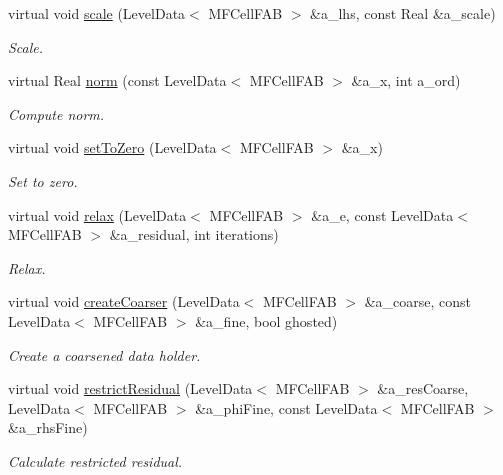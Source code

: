 \begin{DoxyCompactItemize}
virtual void \hyperlink{classmfconductivityop_a88308b72e9cb27f606380115227d2387}{scale} (Level\+Data$<$ M\+F\+Cell\+F\+AB $>$ \&a\+\_\+lhs, const Real \&a\+\_\+scale)
\begin{DoxyCompactList}\small\item\em Scale. \end{DoxyCompactList}\item 
virtual Real \hyperlink{classmfconductivityop_a7a14a2446b9a716cd3a96c6ba8327899}{norm} (const Level\+Data$<$ M\+F\+Cell\+F\+AB $>$ \&a\+\_\+x, int a\+\_\+ord)
\begin{DoxyCompactList}\small\item\em Compute norm. \end{DoxyCompactList}\item 
virtual void \hyperlink{classmfconductivityop_a7900dc43b0bb3841041b1b65ad8a76f9}{set\+To\+Zero} (Level\+Data$<$ M\+F\+Cell\+F\+AB $>$ \&a\+\_\+x)
\begin{DoxyCompactList}\small\item\em Set to zero. \end{DoxyCompactList}\item 
virtual void \hyperlink{classmfconductivityop_aa626950a41c6417ad9a95d3fcc053c75}{relax} (Level\+Data$<$ M\+F\+Cell\+F\+AB $>$ \&a\+\_\+e, const Level\+Data$<$ M\+F\+Cell\+F\+AB $>$ \&a\+\_\+residual, int iterations)
\begin{DoxyCompactList}\small\item\em Relax. \end{DoxyCompactList}\item 
virtual void \hyperlink{classmfconductivityop_a744d58e6ef1b02997d115f8910c1ceac}{create\+Coarser} (Level\+Data$<$ M\+F\+Cell\+F\+AB $>$ \&a\+\_\+coarse, const Level\+Data$<$ M\+F\+Cell\+F\+AB $>$ \&a\+\_\+fine, bool ghosted)
\begin{DoxyCompactList}\small\item\em Create a coarsened data holder. \end{DoxyCompactList}\item 
virtual void \hyperlink{classmfconductivityop_ad9a97a09ec271a5edf074212aa12b6c6}{restrict\+Residual} (Level\+Data$<$ M\+F\+Cell\+F\+AB $>$ \&a\+\_\+res\+Coarse, Level\+Data$<$ M\+F\+Cell\+F\+AB $>$ \&a\+\_\+phi\+Fine, const Level\+Data$<$ M\+F\+Cell\+F\+AB $>$ \&a\+\_\+rhs\+Fine)
\begin{DoxyCompactList}\small\item\em Calculate restricted residual. \end{DoxyCompactList}\item 

\end{DoxyCompactItemize}
